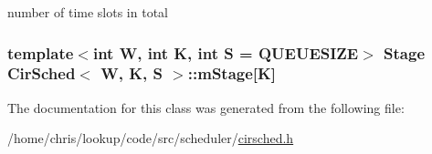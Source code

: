 number of time slots in total 

\hypertarget{classCirSched_a8fecfc9c0deb2e6dca0254f8451b3ab6}{
\subsubsection[{m\-Stage}]{\setlength{\rightskip}{0pt plus 5cm}template$<$int W, int K, int S = Q\-U\-E\-U\-E\-S\-I\-Z\-E$>$ {\bf Stage} {\bf Cir\-Sched}$<$ {\bf W}, K, S $>$\-::m\-Stage\mbox{[}K\mbox{]}}}\label{classCirSched_a8fecfc9c0deb2e6dca0254f8451b3ab6}


The documentation for this class was generated from the following file\-:\begin{DoxyCompactItemize}
\item 
/home/chris/lookup/code/src/scheduler/\hyperlink{cirsched_8h}{cirsched.\-h}\end{DoxyCompactItemize}
